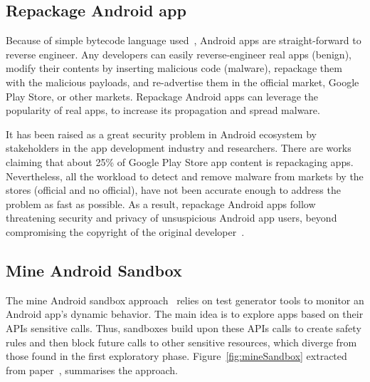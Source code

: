 \subsection{Repackage Android app}\label{sec:repackage}

Because of simple bytecode language used~\cite{DBLP:conf/issta/WangGMC15}, Android apps are straight-forward to reverse engineer. Any developers can easily reverse-engineer real apps (benign), modify their contents by inserting malicious code (malware), repackage them with the malicious payloads, and re-advertise them in the official market, Google Play Store, or other markets. Repackage Android apps can leverage the popularity of real apps, to increase its propagation and spread malware.  

It has been raised as a great security problem in Android ecosystem by stakeholders in the app development industry and researchers. There are works~\cite{DBLP:conf/sigmetrics/ViennotGN14} claiming that about 25\% of Google Play Store app content is repackaging apps. Nevertheless, all the workload to detect and remove malware from markets by the stores (official and no official), have not been accurate enough to address the problem as fast as possible. As a result, repackage Android apps follow threatening security and privacy of unsuspicious Android app users, beyond compromising the copyright of the original developer~\cite{DBLP:journals/access/KimLCP19}.

\subsection{Mine Android Sandbox}\label{sec:android-sandbox}

The mine Android sandbox approach~\cite{DBLP:conf/icse/JamrozikSZ16} relies on test generator tools to monitor an Android app's dynamic behavior. The main idea is to explore apps based on their APIs sensitive calls. Thus, sandboxes build upon these APIs calls to create safety rules and then block future calls to other sensitive resources, which diverge from those found in the first exploratory phase. Figure~\ref{fig:mineSandbox} extracted from paper~\cite{DBLP:conf/wcre/BaoLL18}, summarises the approach. 

